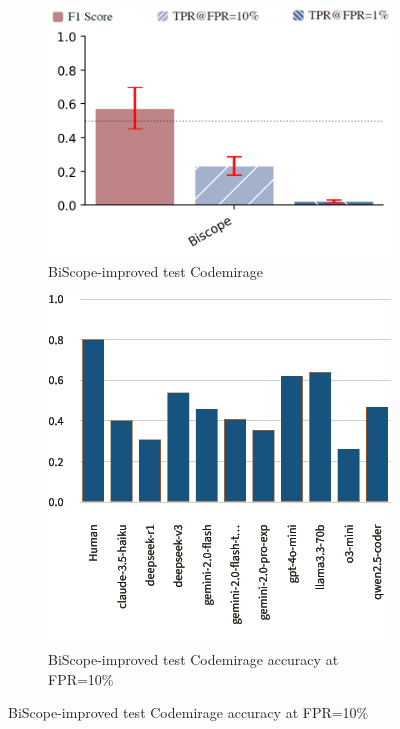 \begin{figure}[H]
    \centering
    \begin{subfigure}[b]{0.4\textwidth}
        \centering
        \includegraphics[width=\linewidth]{img/TEST/BiScope/UncoveringTest.png}
        \caption{BiScope-improved test Codemirage}
        \label{fig:1}
    \end{subfigure}
    \hfill
    \begin{subfigure}[t]{0.4\textwidth}
        \centering
        \includegraphics[width=\linewidth]{img/TEST/BiScope/uncoveing.png}
        \caption{BiScope-improved test Codemirage accuracy at FPR=10\%}
        \label{fig:b1}
    \end{subfigure}
\end{figure}
